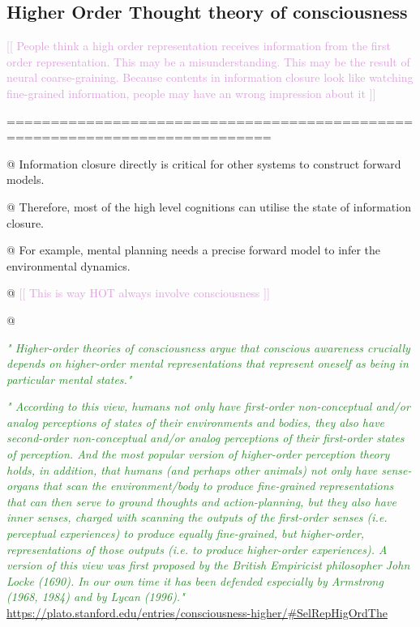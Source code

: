 \documentclass[utf8]{article}
\newenvironment{ants}
			{
			 \begin{easylist}[itemize]
			}
			{
			\end{easylist}
			}
\newcommand{\rewrite}[1]{\textcolor{ForestGreen}{\textit{"#1"}}\newline}
\newcommand{\idea}[1]{\noindent
				\textcolor{Plum}{[[ #1 ]]\newline}}
\begin{document}
		
		

				
			
		\subsection{Higher Order Thought theory of consciousness}	
			\idea{
				People think a high order representation receives information from the first order representation. This may be a misunderstanding. This may be the result of neural coarse-graining. Because contents in information closure look like watching fine-grained information, people may have an wrong impression about it}
		
			============================================================================			
			\begin{ants}
				@ Information closure directly is critical for other systems to construct forward models. 
				
				@ Therefore, most of the high level cognitions can utilise the state of information closure.
				
				@ For example, mental planning needs a precise forward model to infer the environmental dynamics. 
				
				@ \idea{This is way HOT always involve consciousness }
				
				@ \cite{rosenthal2005consciousness}
			\end{ants}
		
		
			\rewrite{
				Higher-order theories of consciousness argue that conscious awareness crucially depends on higher-order mental representations that represent oneself as being in particular mental states.} \cite{lau2011empirical}
		
		
			\rewrite{
				According to this view, humans not only have first-order non-conceptual and/or analog perceptions of states of their environments and bodies, they also have second-order non-conceptual and/or analog perceptions of their first-order states of perception. And the most popular version of higher-order perception theory holds, in addition, that humans (and perhaps other animals) not only have sense-organs that scan the environment/body to produce fine-grained representations that can then serve to ground thoughts and action-planning, but they also have inner senses, charged with scanning the outputs of the first-order senses (i.e. perceptual experiences) to produce equally fine-grained, but higher-order, representations of those outputs (i.e. to produce higher-order experiences). A version of this view was first proposed by the British Empiricist philosopher John Locke (1690). In our own time it has been defended especially by Armstrong (1968, 1984) and by Lycan (1996).} \url{https://plato.stanford.edu/entries/consciousness-higher/#SelRepHigOrdThe}
			
\end{document}
